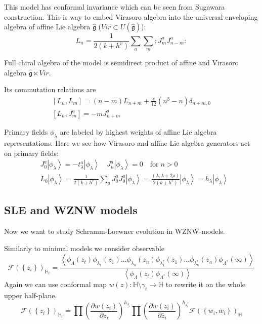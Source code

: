 \documentclass[12pt]{article}
\theoremstyle{definition}
\newcommand{\gfh}{\hat{\mathfrak{g}}}
\theoremstyle{definition} \newtheorem{Def}{Definition}
\begin{document}
This model has conformal invariance which can be seen from 
Sugawara construction. This is way to embed Virasoro algebra into the universal enveloping algebra of affine Lie algebra $\gfh$ ($Vir\subset U(\gfh)$):
\begin{equation}
  \label{eq:4}
  L_n=\frac{1}{2(k+h^v)}\sum\limits_a\sum\limits_m:J^a_m J^a_{n-m}:
\end{equation}
  
Full chiral algebra of the model is semidirect product of affine and Virasoro algebra $\gfh \ltimes Vir$. 

Its commutation relations are
  \begin{equation}
    \label{eq:92}
    \begin{aligned}
      \left[L_n,L_m\right]=(n-m)L_{n+m}+\frac{c}{12}(n^3-n)\delta_{n+m,0}\\
      \left[L_n,J^a_m\right]=-mJ^a_{n+m}
    \end{aligned}
  \end{equation}

Primary fields  $\phi_{\lambda}$ are labeled by highest weights of affine Lie algebra representations. Here we see how Virasoro and affine Lie algebra generators act on primary fields:
  \begin{equation*}
    \begin{aligned}
      & J_0^a\left|\phi_{\lambda}\right>=-t^a_{\lambda}\left|\phi_{\lambda}\right>  \quad    J^a_n\left|\phi_{\lambda}\right>=0 \quad \mbox{for}\; n>0 \\
      & L_0\left|\phi_{\lambda}\right>=\frac{1}{2(k+h^v)}\sum_aJ^a_0J^a_0\left|\phi_{\lambda}\right>=\frac{(\lambda,\lambda+2\rho)}{2(k+h^v)}\left|\phi_{\lambda}\right>=h_{\lambda} \left|\phi_{\lambda}\right>
    \end{aligned}
  \end{equation*}


\subsection{SLE and WZNW models}
Now we want to study Schramm-Loewner evolution in WZNW-models.

Similarly to minimal models we consider observable
\begin{equation*}
  \mathcal{F}(\left\{z_{i}\right\})_{\mathbb{H}_{t}}=
  \frac{\left<\phi_{\Lambda}(z_{t}) \phi_{\lambda_1}(z_{1}) \dots \phi_{\lambda_n}(z_{n}) \phi_{\lambda^{*}_1}(\bar z_{1}) \dots \phi_{\lambda^{*}_n}(\bar z_{n})
      \phi_{\Lambda^{*}}(\infty)\right>}{\left<\phi_{\Lambda}(z_{t})\phi_{\Lambda^{*}}(\infty)\right>}
\end{equation*}
Again we can use conformal map  $w(z):\mathbb{H}\setminus\gamma_{t}\to \mathbb{H}$ to rewrite it on the whole upper half-plane. 
\begin{equation*}
  \mathcal{F}(\left\{z_{i}\right\})_{\mathbb{H}_{t}}=\prod \left(\frac{\partial w(z_{i})}{\partial z_{i}}\right)^{h_{\lambda_i}} 
  \prod \left(\frac{\partial \bar w(\bar z_{i})}{\partial \bar z_{i}}\right)^{h_{\lambda^{*}_i}}
  \mathcal{F}(\left\{w_{i}, \bar w_{i}\right\})_{\mathbb{H}}
\end{equation*}
\end{document}
